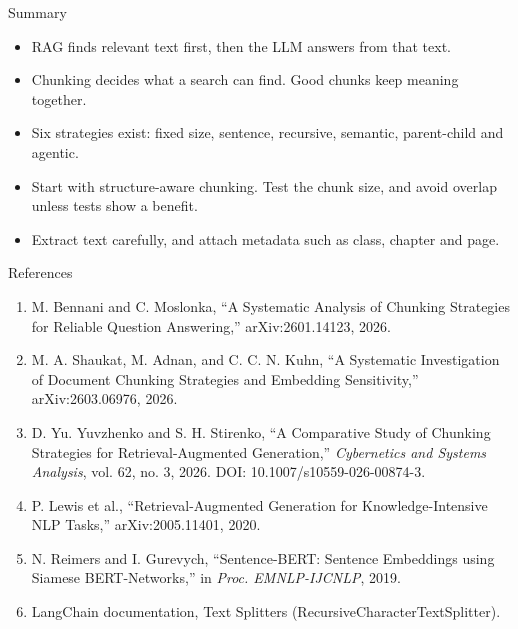 \documentclass[aspectratio=169,10pt]{beamer}
\begin{document}
\begin{frame}[t]{Summary}
\small
\begin{itemize}
  \item RAG finds relevant text first, then the LLM answers from that text.
  \item Chunking decides what a search can find. Good chunks keep meaning together.
  \item Six strategies exist: fixed size, sentence, recursive, semantic, parent-child and agentic.
  \item Start with structure-aware chunking. Test the chunk size, and avoid overlap unless tests show a benefit.
  \item Extract text carefully, and attach metadata such as class, chapter and page.
\end{itemize}
\end{frame}

\begin{frame}[t]{References}
\footnotesize
\begin{enumerate}
  \item M. Bennani and C. Moslonka, ``A Systematic Analysis of Chunking Strategies for Reliable Question Answering,'' arXiv:2601.14123, 2026.
  \item M. A. Shaukat, M. Adnan, and C. C. N. Kuhn, ``A Systematic Investigation of Document Chunking Strategies and Embedding Sensitivity,'' arXiv:2603.06976, 2026.
  \item D. Yu. Yuvzhenko and S. H. Stirenko, ``A Comparative Study of Chunking Strategies for Retrieval-Augmented Generation,'' \emph{Cybernetics and Systems Analysis}, vol. 62, no. 3, 2026. DOI: 10.1007/s10559-026-00874-3.
  \item P. Lewis et al., ``Retrieval-Augmented Generation for Knowledge-Intensive NLP Tasks,'' arXiv:2005.11401, 2020.
  \item N. Reimers and I. Gurevych, ``Sentence-BERT: Sentence Embeddings using Siamese BERT-Networks,'' in \emph{Proc. EMNLP-IJCNLP}, 2019.
  \item LangChain documentation, Text Splitters (RecursiveCharacterTextSplitter).
\end{enumerate}
\end{frame}
\end{document}
